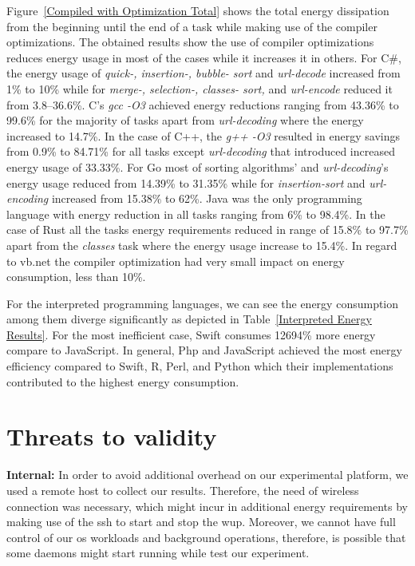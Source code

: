 Figure~\ref{Compiled with Optimization Total} shows the total 
energy dissipation from the beginning until the end of a task 
while making use of the compiler optimizations.
The obtained results show the use of compiler optimizations 
reduces energy usage in most of the cases while it increases 
it in others. 
For C\#, the energy usage of \textit{quick-, 
	insertion-, bubble- sort} and \textit{url-decode} increased from 
1\% to 10\% while for \textit{merge-, selection-, classes- sort,} and 
\textit{url-encode} reduced it from 3.8--36.6\%. 
C's \textit{gcc -O3} achieved energy reductions ranging from 43.36\% 
to 99.6\% for the majority of tasks apart from \textit{url-decoding} 
where the energy increased to 14.7\%.
In the case of C++, the \textit{g++ -O3} resulted in energy savings 
from 0.9\% to 84.71\% for all tasks except \textit{url-decoding} 
that introduced increased energy usage of 33.33\%.
For Go most of sorting algorithms' and \textit{url-decoding}'s energy 
usage reduced from 14.39\% to 31.35\% while for \textit{insertion-sort} 
and \textit{url-encoding} increased from 15.38\% to 62\%. 
Java was the only programming language with energy reduction in 
all tasks ranging from 6\% to 98.4\%.
In the case of Rust all the tasks energy requirements reduced in 
range of 15.8\% to 97.7\% apart from the \textit{classes} task 
where the energy usage increase to 15.4\%. 
In regard to {\sc vb.net} the compiler optimization had very small 
impact on energy consumption, less than 10\%.


For the interpreted programming languages, we can see the energy 
consumption among them diverge significantly as depicted in 
Table~\ref{Interpreted Energy Results}. 
For the most inefficient case, Swift consumes 12694\% more energy 
compare to JavaScript. 
In general, Php and JavaScript achieved the most energy efficiency 
compared to Swift, R, Perl, and Python which their implementations 
contributed to the highest energy consumption.


\section{Threats to validity} \label{threats_of_validity}
\noindent\textbf{Internal:} In order to avoid additional overhead 
on our experimental platform, we used a remote host to collect our 
results. 
Therefore, the need of wireless connection was necessary, which 
might incur in additional energy requirements by making use of 
the {\sc ssh} to start and stop the {\sc wup}. 
Moreover, we cannot have full control of our {\sc os} workloads 
and background operations, therefore, is possible that some 
daemons might start running while test our experiment. 

